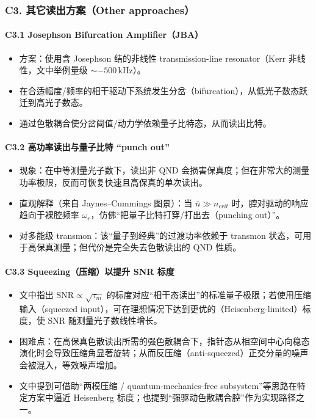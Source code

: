 \documentclass[12pt,a4paper,oneside]{ctexbook}
\providecommand{\tightlist}{%
  \setlength{\itemsep}{0pt}\setlength{\parskip}{0pt}}
\let\oldparagraph\paragraph
\renewcommand{\paragraph}[1]{\oldparagraph{#1}\mbox{}}
\begin{document}
\subsubsection{C3. 其它读出方案（Other
approaches）}\label{c3.-ux5176ux5b83ux8bfbux51faux65b9ux6848other-approaches}

\paragraph{C3.1 Josephson Bifurcation
Amplifier（JBA）}\label{c3.1-josephson-bifurcation-amplifierjba}

\begin{itemize}
\tightlist
\item
  方案：使用含 Josephson 结的非线性 transmission-line resonator（Kerr
  非线性，文中举例量级 \(\sim -500\,\mathrm{kHz}\)）。
\item
  在合适幅度/频率的相干驱动下系统发生分岔（bifurcation），从低光子数态跃迁到高光子数态。
\item
  通过色散耦合使分岔阈值/动力学依赖量子比特态，从而读出比特。
\end{itemize}

\paragraph{C3.2 高功率读出与量子比特 ``punch
out''}\label{c3.2-ux9ad8ux529fux7387ux8bfbux51faux4e0eux91cfux5b50ux6bd4ux7279-punch-out}

\begin{itemize}
\tightlist
\item
  现象：在中等测量光子数下，读出非 QND
  会损害保真度；但在非常大的测量功率极限，反而可恢复快速且高保真的单次读出。
\item
  直观解释（来自 Jaynes--Cummings 图景）：当 \(\bar{n}\gg n_{crit}\)
  时，腔对驱动的响应趋向于裸腔频率
  \(\omega_r\)，仿佛``把量子比特打穿/打出去（punching out）''。
\item
  对多能级 transmon：该``量子到经典''的过渡功率依赖于 transmon
  状态，可用于高保真测量；但代价是完全失去色散读出的 QND 性质。
\end{itemize}

\paragraph{C3.3 Squeezing（压缩）以提升 SNR
标度}\label{c3.3-squeezingux538bux7f29ux4ee5ux63d0ux5347-snr-ux6807ux5ea6}

\begin{itemize}
\tightlist
\item
  文中指出 \(\mathrm{SNR}\propto \sqrt{\tau_m}\)
  的标度对应``相干态读出''的标准量子极限；若使用压缩输入（squeezed
  input），可在理想情况下达到更优的（Heisenberg-limited）标度，使 SNR
  随测量光子数线性增长。
\item
  困难点：在高保真色散读出所需的强色散耦合下，指针态从相空间中心向稳态演化时会导致压缩角显著旋转；从而反压缩（anti-squeezed）正交分量的噪声会被混入，等效噪声增加。
\item
  文中提到可借助``两模压缩 / quantum-mechanics-free
  subsystem''等思路在特定方案中逼近 Heisenberg
  标度；也提到``强驱动色散耦合腔''作为实现路径之一。
\end{itemize}
\end{document}
